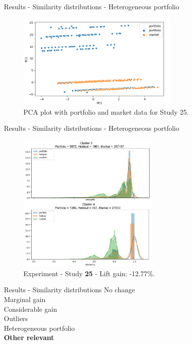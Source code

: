 
\begin{frame}{Results - Similarity distributions - Heterogeneous portfolio}
    \begin{figure}
       \centering
       \caption{PCA plot with portfolio and market data for Study 25.}
       \includegraphics[width=8cm]{fig/ch4-study-25-pca.png}
    \end{figure}
\end{frame}


\begin{frame}{Results - Similarity distributions - Heterogeneous portfolio}
    \begin{figure}
       \centering
       \includegraphics[width=7cm]{fig/ch4-study-25-clusters-simi-plot.png}
       \caption{Experiment \nameExperimentI{} - Study \textbf{25} - Lift gain: \colorbox{dred}{-12.77\%.}}
    \end{figure}
\end{frame}


\begin{frame}{Results - Similarity distributions}
    No change \\ 
    \vspace{0.5cm}
    Marginal gain \\
    \vspace{0.5cm}
    Considerable gain \\
    \vspace{0.5cm}
    Outliers \\
    \vspace{0.5cm}
    Heterogeneous portfolio \\
    \vspace{0.5cm}
    \textbf{Other relevant} 
\end{frame}

